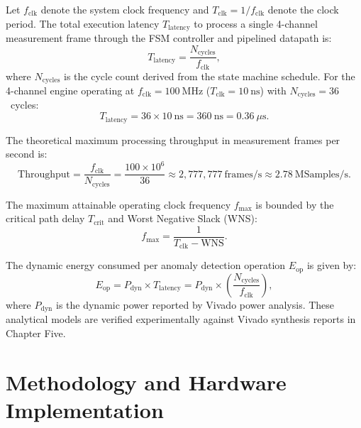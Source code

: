 \documentclass[11pt,a4paper]{report}
\begin{document}
Let $f_{\text{clk}}$ denote the system clock frequency and $T_{\text{clk}} = 1/f_{\text{clk}}$
denote the clock period. The total execution latency $T_{\text{latency}}$ to process a single
4-channel measurement frame through the FSM controller and pipelined datapath is:
\begin{equation}
T_{\text{latency}} = \frac{N_{\text{cycles}}}{f_{\text{clk}}},
\label{eq:ch3_latency_model}
\end{equation}
where $N_{\text{cycles}}$ is the cycle count derived from the state machine schedule.
For the 4-channel engine operating at $f_{\text{clk}} = 100~\text{MHz}$ ($T_{\text{clk}} = 10~\text{ns}$)
with $N_{\text{cycles}} = 36$~cycles:
\begin{equation}
T_{\text{latency}} = 36 \times 10~\text{ns} = 360~\text{ns} = 0.36~\mu\text{s}.
\end{equation}

The theoretical maximum processing throughput in measurement frames per second is:
\begin{equation}
\text{Throughput} = \frac{f_{\text{clk}}}{N_{\text{cycles}}} = \frac{100 \times 10^6}{36} \approx 2,777,777~\text{frames/s} \approx 2.78~\text{MSamples/s}.
\label{eq:ch3_throughput_model}
\end{equation}

The maximum attainable operating clock frequency $f_{\max}$ is bounded by the critical
path delay $T_{\text{crit}}$ and Worst Negative Slack (WNS):
\begin{equation}
f_{\max} = \frac{1}{T_{\text{clk}} - \text{WNS}}.
\label{eq:ch3_fmax_model}
\end{equation}

The dynamic energy consumed per anomaly detection operation $E_{\text{op}}$ is given by:
\begin{equation}
E_{\text{op}} = P_{\text{dyn}} \times T_{\text{latency}} = P_{\text{dyn}} \times \left( \frac{N_{\text{cycles}}}{f_{\text{clk}}} \right),
\label{eq:ch3_energy_model}
\end{equation}
where $P_{\text{dyn}}$ is the dynamic power reported by Vivado power analysis. These analytical
models are verified experimentally against Vivado synthesis reports in Chapter Five.


\chapter{Methodology and Hardware Implementation}
\end{document}
